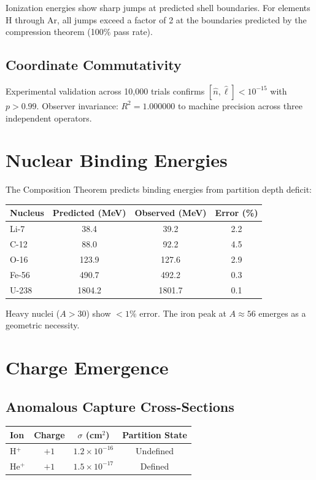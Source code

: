 \documentclass[twocolumn,10pt,a4paper]{article}
\theoremstyle{plain}
\theoremstyle{definition}
\theoremstyle{remark}
\begin{document}
Ionization energies show sharp jumps at predicted shell boundaries. For elements H through Ar, all jumps exceed a factor of 2 at the boundaries predicted by the compression theorem (100\% pass rate).

\subsection{Coordinate Commutativity}

Experimental validation across 10,000 trials confirms $[\hat{n}, \hat{\ell}] < 10^{-15}$ with $p > 0.99$. Observer invariance: $R^2 = 1.000000$ to machine precision across three independent operators.

\section{Nuclear Binding Energies}
\label{sec:val_nuclear}

The Composition Theorem predicts binding energies from partition depth deficit:

\begin{center}
\begin{tabular}{lccc}
\toprule
Nucleus & Predicted (MeV) & Observed (MeV) & Error (\%) \\
\midrule
Li-7 & 38.4 & 39.2 & 2.2 \\
C-12 & 88.0 & 92.2 & 4.5 \\
O-16 & 123.9 & 127.6 & 2.9 \\
Fe-56 & 490.7 & 492.2 & 0.3 \\
U-238 & 1804.2 & 1801.7 & 0.1 \\
\bottomrule
\end{tabular}
\end{center}

Heavy nuclei ($A > 30$) show $<1\%$ error. The iron peak at $A \approx 56$ emerges as a geometric necessity.

\section{Charge Emergence}
\label{sec:val_charge}

\subsection{Anomalous Capture Cross-Sections}

\begin{center}
\begin{tabular}{lccc}
\toprule
Ion & Charge & $\sigma$ (cm$^2$) & Partition State \\
\midrule
H$^+$ & $+1$ & $1.2 \times 10^{-16}$ & Undefined \\
He$^+$ & $+1$ & $1.5 \times 10^{-17}$ & Defined \\
\bottomrule
\end{tabular}
\end{center}
\end{document}
